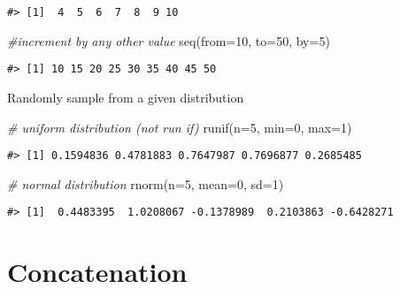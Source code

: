 \documentclass[
]{book}
\newenvironment{Shaded}{\begin{snugshade}}{\end{snugshade}}
\newcommand{\AttributeTok}[1]{\textcolor[rgb]{0.77,0.63,0.00}{#1}}
\newcommand{\CommentTok}[1]{\textcolor[rgb]{0.56,0.35,0.01}{\textit{#1}}}
\newcommand{\DecValTok}[1]{\textcolor[rgb]{0.00,0.00,0.81}{#1}}
\newcommand{\FunctionTok}[1]{\textcolor[rgb]{0.00,0.00,0.00}{#1}}
\newcommand{\NormalTok}[1]{#1}
\begin{document}
\begin{verbatim}
#> [1]  4  5  6  7  8  9 10
\end{verbatim}

\begin{Shaded}
\begin{Highlighting}[]
\CommentTok{\#increment by any other value}
\FunctionTok{seq}\NormalTok{(}\AttributeTok{from=}\DecValTok{10}\NormalTok{, }\AttributeTok{to=}\DecValTok{50}\NormalTok{, }\AttributeTok{by=}\DecValTok{5}\NormalTok{)}
\end{Highlighting}
\end{Shaded}

\begin{verbatim}
#> [1] 10 15 20 25 30 35 40 45 50
\end{verbatim}

Randomly sample from a given distribution

\begin{Shaded}
\begin{Highlighting}[]
\CommentTok{\# uniform distribution (not \textquotesingle{}run if\textquotesingle{})}
\FunctionTok{runif}\NormalTok{(}\AttributeTok{n=}\DecValTok{5}\NormalTok{, }\AttributeTok{min=}\DecValTok{0}\NormalTok{, }\AttributeTok{max=}\DecValTok{1}\NormalTok{)}
\end{Highlighting}
\end{Shaded}

\begin{verbatim}
#> [1] 0.1594836 0.4781883 0.7647987 0.7696877 0.2685485
\end{verbatim}

\begin{Shaded}
\begin{Highlighting}[]
\CommentTok{\# normal distribution}
\FunctionTok{rnorm}\NormalTok{(}\AttributeTok{n=}\DecValTok{5}\NormalTok{, }\AttributeTok{mean=}\DecValTok{0}\NormalTok{, }\AttributeTok{sd=}\DecValTok{1}\NormalTok{)}
\end{Highlighting}
\end{Shaded}

\begin{verbatim}
#> [1]  0.4483395  1.0208067 -0.1378989  0.2103863 -0.6428271
\end{verbatim}

\hypertarget{concatenation}{%
\section{Concatenation}\label{concatenation}}
\end{document}
